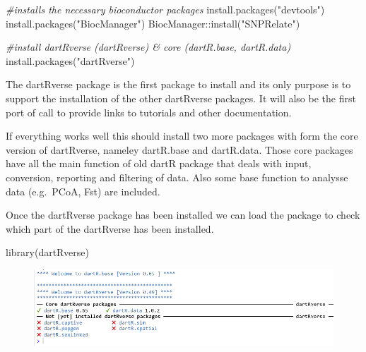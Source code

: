 \documentclass[
  letterpaper,
  DIV=11,
  numbers=noendperiod]{scrreprt}
\newenvironment{Shaded}{\begin{snugshade}}{\end{snugshade}}
\newcommand{\CommentTok}[1]{\textcolor[rgb]{0.38,0.63,0.69}{\textit{#1}}}
\newcommand{\FunctionTok}[1]{\textcolor[rgb]{0.02,0.16,0.49}{#1}}
\newcommand{\NormalTok}[1]{\textcolor[rgb]{0.00,0.44,0.13}{#1}}
\newcommand{\SpecialCharTok}[1]{\textcolor[rgb]{0.25,0.44,0.63}{#1}}
\newcommand{\StringTok}[1]{\textcolor[rgb]{0.25,0.44,0.63}{#1}}
\begin{document}
\begin{Shaded}
\begin{Highlighting}[]
\CommentTok{\#installs the necessary bioconductor packages}
\FunctionTok{install.packages}\NormalTok{(}\StringTok{"devtools"}\NormalTok{)}
\FunctionTok{install.packages}\NormalTok{(}\StringTok{"BiocManager"}\NormalTok{)}
\NormalTok{BiocManager}\SpecialCharTok{::}\FunctionTok{install}\NormalTok{(}\StringTok{"SNPRelate"}\NormalTok{)}

\CommentTok{\#install dartRverse (dartRverse) \& core (dartR.base, dartR.data)}
\FunctionTok{install.packages}\NormalTok{(}\StringTok{"dartRverse"}\NormalTok{)}
\end{Highlighting}
\end{Shaded}

The dartRverse package is the first package to install and its only
purpose is to support the installation of the other dartRverse packages.
It will also be the first port of call to provide links to tutorials and
other documentation.

If everything works well this should install two more packages with form
the core version of dartRverse, nameley dartR.base and dartR.data. Those
core packages have all the main function of old dartR package that deals
with input, conversion, reporting and filtering of data. Also some base
function to analysse data (e.g.~PCoA, Fst) are included.

Once the dartRverse package has been installed we can load the package
to check which part of the dartRverse has been installed.

\begin{Shaded}
\begin{Highlighting}[]
\FunctionTok{library}\NormalTok{(dartRverse)}
\end{Highlighting}
\end{Shaded}

\begin{figure}

\includegraphics{images/dartRverse.png} \hfill{}

\end{figure}
\end{document}
